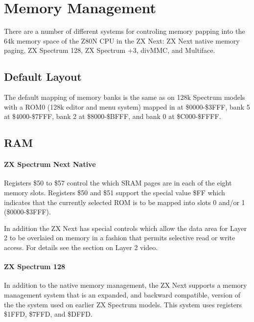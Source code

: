 \section {Memory Management}

There are a number of different systems for controling memory papping
into the 64k memory space of the Z80N CPU in the ZX Next: ZX Next
native memory paging, ZX Spectrum 128, ZX Spectrum +3, divMMC, and
Multiface.

\subsection{Default Layout}
The default mapping of memory banks is the same as on 128k Spectrum
models with a ROM0 (128k editor and menu system) mapped in at
\$0000-\$3FFF, bank 5 at \$4000-\$7FFF, bank 2 at \$8000-\$BFFF, and
bank 0 at \$C000-\$FFFF.

\subsection{RAM}

\paragraph{ZX Spectrum Next Native}
Registers \$50 to \$57 control the which SRAM pages are in each of the
eight memory slots.  Registers \$50 and \$51 support the special value
\$FF which indicates that the currently selected ROM is to be mapped
into slots 0 and/or 1 (\$0000-\$3FFF).










In addition the ZX Next has special controls which allow the data area
for Layer 2 to be overlaied on memory in a fashion that permits
selective read or write access. For details see the section on Layer 2
video.

\paragraph{ZX Spectrum 128}
In addition to the native memory management, the ZX Next supports a
memory management system that is an expanded, and backward compatible,
version of the the system used on earlier ZX Spectrum models. This
system uses registers \$1FFD, \$7FFD, and \$DFFD.

